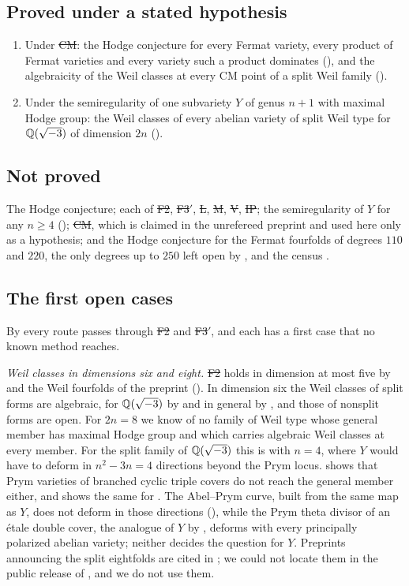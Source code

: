 \subsection*{Proved under a stated hypothesis}
\begin{enumerate}[label=\textup{(\arabic*)},resume]
\item Under \st{CM}: the Hodge conjecture for every Fermat variety, every
product of Fermat varieties and every variety such a product dominates
(), and the algebraicity of the Weil classes at every CM point
of a split Weil family ().
\item Under the semiregularity of one subvariety $Y$ of genus $n+1$ with
maximal Hodge group: the Weil classes of every abelian variety of split Weil
type for $\mathbb{Q}(\sqrt{-3})$ of dimension $2n$ ().
\end{enumerate}

\subsection*{Not proved}
The Hodge conjecture; each of \st{F2}, \st{F3$'$}, \st{L}, \st{M}, \st{V},
\st{IP}; the semiregularity of $Y$ for any $n\ge4$
(); \st{CM}, which is claimed in the unrefereed preprint
\cite{OAI26} and used here only as a hypothesis; and the Hodge conjecture for
the Fermat fourfolds of degrees $110$ and $220$, the only degrees up to $250$
left open by , \cite{Pet26} and the census
\cite{Jum26b}.

\subsection*{The first open cases}
By  every route passes through \st{F2} and \st{F3$'$}, and each
has a first case that no known method reaches.

\emph{Weil classes in dimensions six and eight.} \st{F2} holds in dimension
at most five by \cite{MZ99} and the Weil fourfolds of the preprint
\cite{Mar25a} (). In dimension six the Weil classes of
split forms are algebraic, for $\mathbb{Q}(\sqrt{-3})$ by \cite{Sch88,Sch98} and
in general by \cite{Mar25a}, and those of nonsplit forms are open.
For $2n=8$ we know of no family of Weil type whose general member has
maximal Hodge group and which carries algebraic Weil classes at every
member. For the split family of
$\mathbb{Q}(\sqrt{-3})$ this is  with $n=4$, where $Y$ would have to
deform in $n^{2}-3n=4$ directions beyond the Prym locus.
 shows that Prym varieties of branched cyclic triple
covers do not reach the general member either, and  shows
the same for . The Abel--Prym curve, built from the same
map as $Y$, does not deform in those directions (), while
the Prym theta divisor of an \'etale double cover, the analogue of $Y$ by
, deforms with every principally polarized abelian
variety; neither decides the question for $Y$. Preprints announcing the split eightfolds are cited in
\cite{BhH8}; we could not locate them in the public release of
\cite{OAI26}, and we do not use them.

